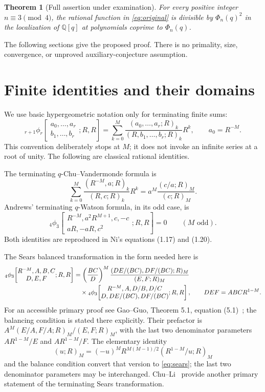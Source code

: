 \documentclass[11pt]{article}
\newtheorem{theorem}{Theorem}
\newcommand{\qp}[3]{(#1;#2)_{#3}}
\newcommand{\F}[2]{ {}_4\phi_3\!\left[\begin{matrix}#1\\#2\end{matrix};R,R\right] }
\begin{document}
\begin{theorem}[Full assertion under examination]\label{thm:main}
For every positive integer $n\equiv3\pmod4$, the rational function in
\eqref{eq:original} is divisible by $\Phi_n(q)^2$ in the localization of
$\mathbb Q[q]$ at polynomials coprime to $\Phi_n(q)$.
\end{theorem}
The following sections give the proposed proof. There is no primality,
size, convergence, or unproved auxiliary-conjecture assumption.

\section{Finite identities and their domains}
We use basic hypergeometric notation only for terminating finite sums:
\[
 {}_{r+1}\phi_r\!\left[\begin{matrix}a_0,\ldots,a_r\\b_1,\ldots,b_r
 \end{matrix};R,R\right]
 =\sum_{k=0}^{M}\frac{\qp{a_0,\ldots,a_r}{R}{k}}
 {\qp{R,b_1,\ldots,b_r}{R}{k}}R^k,
 \qquad a_0=R^{-M}.
\]
This convention deliberately stops at $M$; it does not invoke an infinite
series at a root of unity. The following are classical rational identities.

The terminating $q$-Chu--Vandermonde formula is
\begin{equation}\label{eq:chu}
 \sum_{k=0}^{M}\frac{\qp{R^{-M},a}{R}{k}}{\qp{R,c}{R}{k}}R^k
 =a^M\frac{\qp{c/a}{R}{M}}{\qp{c}{R}{M}}.
\end{equation}
Andrews' terminating $q$-Watson formula, in its odd case, is
\begin{equation}\label{eq:watson}
 {}_4\phi_3\!\left[\begin{matrix}R^{-M},a^2R^{M+1},c,-c\\
 aR,-aR,c^2\end{matrix};R,R\right]=0\qquad(M\text{ odd}).
\end{equation}
Both identities are reproduced in Ni's equations (1.17) and (1.20).

The Sears balanced transformation in the form needed here is
\begin{align}\label{eq:sears}
 \F{R^{-M},A,B,C}{D,E,F}
 &=\left(\frac{BC}{D}\right)^M
 \frac{\qp{DE/(BC),DF/(BC)}{R}{M}}{\qp{E,F}{R}{M}}\notag\\
 &\quad\times
 \F{R^{-M},A,D/B,D/C}{D,DE/(BC),DF/(BC)},
 \qquad DEF=ABC R^{1-M}.
\end{align}
For an accessible primary proof see Gao--Guo, Theorem 5.1,
equation (5.1)~\cite{GG}; the balancing condition is stated there explicitly.
Their prefactor is
$A^M\qp{E/A,F/A}{R}{M}/\qp{E,F}{R}{M}$, with the last two denominator
parameters $AR^{1-M}/E$ and $AR^{1-M}/F$. The elementary identity
\begin{equation}\label{eq:invert}
 \qp{u}{R}{M}=(-u)^M R^{M(M-1)/2}
 \qp{R^{1-M}/u}{R}{M}
\end{equation}
and the balance condition convert that version to \eqref{eq:sears}; the
last two denominator parameters may be interchanged. Chu--Li~\cite{CL}
provide another primary statement of the terminating Sears transformation.
\end{document}
